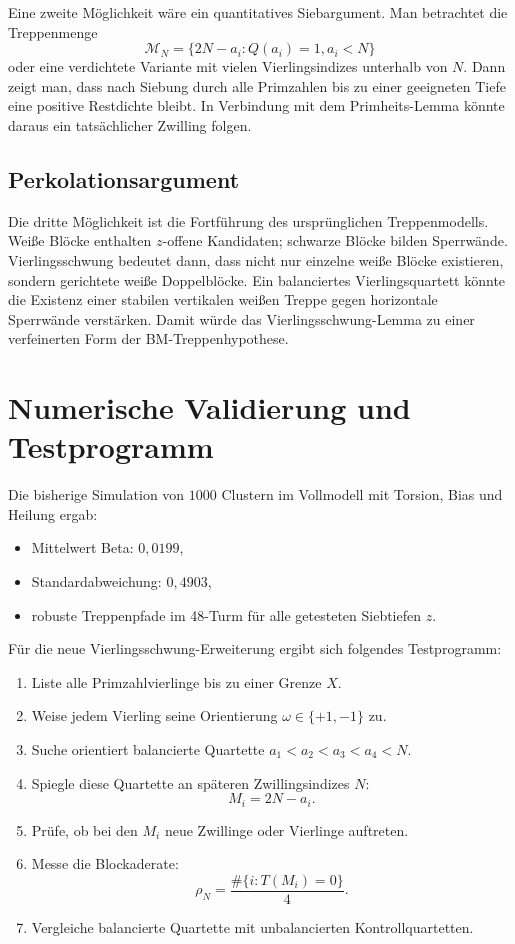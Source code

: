 \documentclass[11pt,a4paper]{article}
\theoremstyle{definition}
\begin{document}
Eine zweite Möglichkeit wäre ein quantitatives Siebargument. Man betrachtet die Treppenmenge
\[
\mathcal{M}_N=\{2N-a_i: Q(a_i)=1, a_i<N\}
\]
oder eine verdichtete Variante mit vielen Vierlingsindizes unterhalb von $N$. Dann zeigt man, dass nach Siebung durch alle Primzahlen bis zu einer geeigneten Tiefe eine positive Restdichte bleibt. In Verbindung mit dem Primheits-Lemma könnte daraus ein tatsächlicher Zwilling folgen.

\subsection{Perkolationsargument}

Die dritte Möglichkeit ist die Fortführung des ursprünglichen Treppenmodells. Weiße Blöcke enthalten $z$-offene Kandidaten; schwarze Blöcke bilden Sperrwände. Vierlingsschwung bedeutet dann, dass nicht nur einzelne weiße Blöcke existieren, sondern gerichtete weiße Doppelblöcke. Ein balanciertes Vierlingsquartett könnte die Existenz einer stabilen vertikalen weißen Treppe gegen horizontale Sperrwände verstärken. Damit würde das Vierlingsschwung-Lemma zu einer verfeinerten Form der BM-Treppenhypothese.

\section{Numerische Validierung und Testprogramm}

Die bisherige Simulation von $1000$ Clustern im Vollmodell mit Torsion, Bias und Heilung ergab:
\begin{itemize}[leftmargin=*]
\item Mittelwert Beta: $0{,}0199$,
\item Standardabweichung: $0{,}4903$,
\item robuste Treppenpfade im 48-Turm für alle getesteten Siebtiefen $z$.
\end{itemize}

Für die neue Vierlingsschwung-Erweiterung ergibt sich folgendes Testprogramm:

\begin{enumerate}[leftmargin=*]
\item Liste alle Primzahlvierlinge bis zu einer Grenze $X$.
\item Weise jedem Vierling seine Orientierung $\omega\in\{+1,-1\}$ zu.
\item Suche orientiert balancierte Quartette $a_1<a_2<a_3<a_4<N$.
\item Spiegle diese Quartette an späteren Zwillingsindizes $N$:
\[
M_i=2N-a_i.
\]
\item Prüfe, ob bei den $M_i$ neue Zwillinge oder Vierlinge auftreten.
\item Messe die Blockaderate:
\[
\rho_N=\frac{\#\{i:T(M_i)=0\}}{4}.
\]
\item Vergleiche balancierte Quartette mit unbalancierten Kontrollquartetten.
\end{enumerate}
\end{document}
